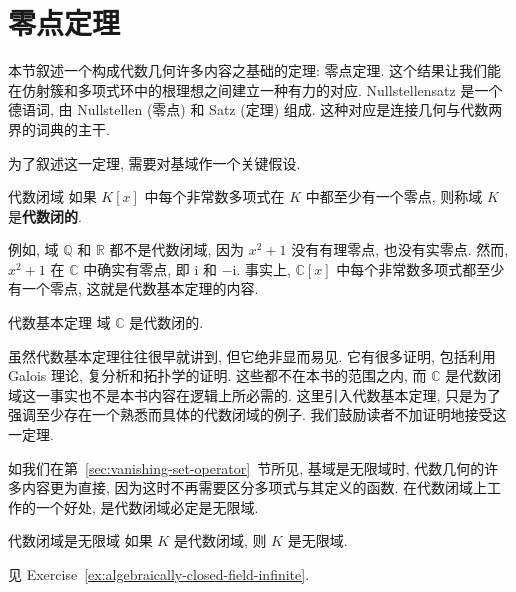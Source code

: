 \section{零点定理}\label{sec:nullstellensatz}

\BookPairedNote
  {本节叙述一个构成代数几何许多内容之基础的定理: 零点定理. 这个结果让我们能在仿射簇和多项式环中的根理想之间建立一种有力的对应.}
  {\textquotedbl{}Nullstellensatz\textquotedbl{} 是一个德语词, 由 \textquotedbl{}Nullstellen\textquotedbl{} (零点) 和 \textquotedbl{}Satz\textquotedbl{} (定理) 组成.}
\noindent 这种对应是连接几何与代数两界的词典的主干.

为了叙述这一定理, 需要对基域作一个关键假设.

\begin{Definition}{代数闭域}\leavevmode\label{def:algebraically-closed-field}
  如果 $K[x]$ 中每个非常数多项式在 $K$ 中都至少有一个零点, 则称域 $K$ 是\textbf{代数闭的}.
\end{Definition}

例如, 域 $\mathbb{Q}$ 和 $\mathbb{R}$ 都不是代数闭域, 因为 $x^{2}+1$ 没有有理零点, 也没有实零点. 然而, $x^{2}+1$ 在 $\mathbb{C}$ 中确实有零点, 即 $\mathrm{i}$ 和 $-\mathrm{i}$. 事实上, $\mathbb{C}[x]$ 中每个非常数多项式都至少有一个零点, 这就是代数基本定理的内容.

\begin{Theorem}{代数基本定理}\leavevmode\label{thm:fundamental-theorem-of-algebra}
  域 $\mathbb{C}$ 是代数闭的.
\end{Theorem}

虽然代数基本定理往往很早就讲到, 但它绝非显而易见. 它有很多证明, 包括利用 Galois 理论, 复分析和拓扑学的证明. 这些都不在本书的范围之内, 而 $\mathbb{C}$ 是代数闭域这一事实也不是本书内容在逻辑上所必需的. 这里引入代数基本定理, 只是为了强调至少存在一个熟悉而具体的代数闭域的例子. 我们鼓励读者不加证明地接受这一定理.

如我们在第~\ref{sec:vanishing-set-operator}~节所见, 基域是无限域时, 代数几何的许多内容更为直接, 因为这时不再需要区分多项式与其定义的函数. 在代数闭域上工作的一个好处, 是代数闭域必定是无限域.

\begin{Proposition}{代数闭域是无限域}\leavevmode\label{prop:algebraically-closed-fields-are-infinite}
  如果 $K$ 是代数闭域, 则 $K$ 是无限域.
\end{Proposition}

\begin{Proof}
  见 Exercise~\ref{ex:algebraically-closed-field-infinite}.
\end{Proof}

